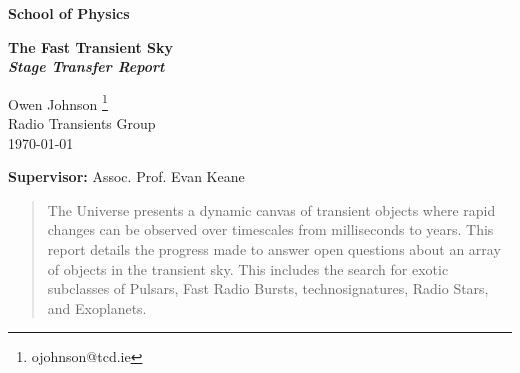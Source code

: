 \documentclass[a4paper,12pt]{article}
\numberwithin{equation}{section}
\newcounter{daggerfootnote}
\newcommand*{\daggerfootnote}[1]{%
    \setcounter{daggerfootnote}{\value{footnote}}%
    \renewcommand*{\thefootnote}{\fnsymbol{footnote}}%
    \footnote[2]{#1}%
    \setcounter{footnote}{\value{daggerfootnote}}%
    \renewcommand*{\thefootnote}{\arabic{footnote}}%
    }
\begin{document}
\begin{minipage}[b]{110mm}
        {\LARGE\bf School of Physics %
        \vspace*{17mm}}
\end{minipage}
\hfill
\begin{minipage}[t]{40mm}               
\end{minipage}
\par\noindent                                           %
\vspace*{2cm}
\begin{center}
        \Large\bf The Fast Transient Sky\\
        \normalsize \textit{Stage Transfer Report}
\end{center}
\vspace*{1.5cm}
\begin{center}
        Owen Johnson\daggerfootnote{ojohnson@tcd.ie}\\ 
        Radio Transients Group\\ 
        \monthyeardate\today            %
\end{center}
\vspace*{5mm}
%
%                       

\vspace*{1cm}


\vfill
{\bf Supervisor:} Assoc. Prof. Evan Keane    
\thispagestyle{empty} 

\newpage
\thispagestyle{empty} 
\begin{abstract}
        The Universe presents a dynamic canvas of transient objects where rapid changes can be observed over timescales from milliseconds to years. This report details the progress made to answer open questions about an array of objects in the transient sky. This includes the search for exotic subclasses of Pulsars, Fast Radio Bursts, technosignatures, Radio Stars, and Exoplanets.
\end{abstract}
\end{document}
